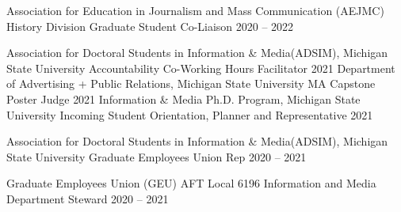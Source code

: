 

\begin{cvhonors}
  \cvhonor
    {Association for Education in Journalism and Mass Communication (AEJMC) History Division} %
    {Graduate Student Co-Liaison } %
    {} %
    {2020 -- 2022} %
 
\end{cvhonors}

\begin{cvhonors}
    \cvhonor
    {Association for Doctoral Students in Information \& Media(ADSIM), Michigan State University } %
    {Accountability Co-Working Hours Facilitator } %
    {} %
    {2021} %
  \cvhonor
    {Department of Advertising + Public Relations, Michigan State University } %
    {MA Capstone Poster Judge } %
    {} %
    {2021} %
 \cvhonor
    {Information \& Media Ph.D. Program, Michigan State University} %
    {Incoming Student Orientation, Planner and Representative } %
    {} %
    {2021} %
    
  \cvhonor
    {Association for Doctoral Students in Information \& Media(ADSIM), Michigan State University } %
    {Graduate Employees Union Rep } %
    {} %
    {2020 -- 2021} %

  \cvhonor
    {Graduate Employees Union (GEU) AFT Local 6196} %
    {Information and Media Department Steward } %
    {} %
    {2020 -- 2021} %
\end{cvhonors}\pagebreak

